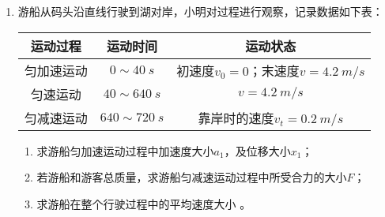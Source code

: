 \begin{enumerate}[leftmargin=0em]
\begin{minipage}[h!]{0.7\linewidth}
\vspace{0.3em}
\end{minipage}
\hfill
\begin{minipage}[h!]{0.3\linewidth}
\flushright
\vspace{0.3em}

\vspace{0.3em}
\end{minipage}


\newpage
\item 
{}
游船从码头沿直线行驶到湖对岸，小明对过程进行观察，记录数据如下表：
\begin{table}[h!]
\centering 
\begin{tabular}{|c|c|c|}
\hline 
运动过程 & 运动时间 & 运动状态
 \\
\hline
匀加速运动 & $ 0 \sim 40\ s $ & 初速度$ v_{0}=0 $；末速度$ v=4.2\ m/s $
 \\
\hline
匀速运动 & $ 40 \sim 640 \ s $ & $ v=4.2\ m/s $ 
 \\
\hline
匀减速运动 & $ 640 \sim 720 \ s $ & 靠岸时的速度$ v_{t}=0.2\ m/s $\\ 
\hline 
\end{tabular}
\end{table} 

\begin{enumerate}
\renewcommand{\labelenumi}{\arabic{enumi}.}
\item
求游船匀加速运动过程中加速度大小$ a_{1} $，及位移大小$ x_{1} $；
\item 
若游船和游客总质量，求游船匀减速运动过程中所受合力的大小$ F $；
\item 
求游船在整个行驶过程中的平均速度大小 。



\end{enumerate}







\end{enumerate}





